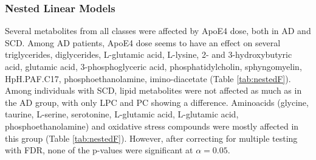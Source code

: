 \documentclass{amsart}
\begin{document}
\subsubsection{Nested Linear Models}
Several metabolites from all classes were affected by ApoE4 dose, both in AD and SCD. Among AD patients, ApoE4 dose seems to have an effect on several triglycerides, diglycerides, L-glutamic acid, L-lysine, 2- and 3-hydroxybutyric acid, glutamic acid, 3-phosphoglyceric acid, phosphatidylcholin, sphyngomyelin, HpH.PAF.C17, phosphoethanolamine, imino-diacetate (Table \ref{tab:nestedF}). Among individuals with SCD, lipid metabolites were not affected as much as in the AD group, with only LPC and PC showing a difference. Aminoacids (glycine, taurine, L-serine, serotonine, L-glutamic acid, L-glutamic acid, phosphoethanolamine) and oxidative stress compounds were mostly affected in this group (Table \ref{tab:nestedF}). However, after correcting for multiple testing with FDR, none of the p-values were significant at $\alpha=0.05$.
\end{document}
